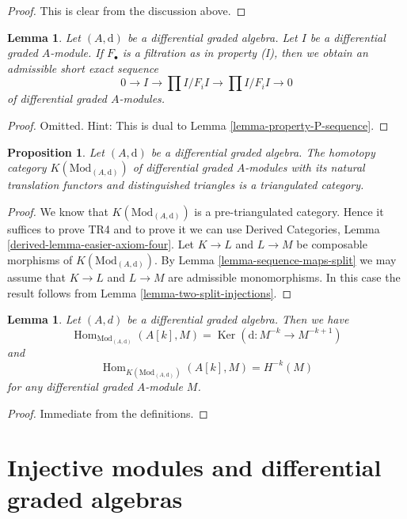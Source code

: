 \documentclass{stacks-project}
\theoremstyle{plain}
\newtheorem{proposition}[subsection]{Proposition}
\newtheorem{lemma}[subsection]{Lemma}
\theoremstyle{definition}
\theoremstyle{remark}
\numberwithin{equation}{subsection}
\def\Hom{\mathop{\mathrm{Hom}}\nolimits}
\def\Ker{\mathop{\mathrm{Ker}}}
\begin{document}
\begin{proof}
This is clear from the discussion above.
\end{proof}

\begin{lemma}
\label{lemma-property-I-sequence}
Let $(A, \text{d})$ be a differential graded algebra.
Let $I$ be a differential graded $A$-module. If $F_\bullet$
is a filtration as in property (I), then we obtain an
admissible short exact sequence
$$
0 \to I \to
\prod\nolimits I/F_iI \to
\prod\nolimits I/F_iI \to 0
$$
of differential graded $A$-modules.
\end{lemma}

\begin{proof}
Omitted. Hint: This is dual to Lemma \ref{lemma-property-P-sequence}.
\end{proof}

\begin{proposition}
\label{proposition-homotopy-category-triangulated}
Let $(A, \text{d})$ be a differential graded algebra. The homotopy category
$K(\text{Mod}_{(A, \text{d})})$ of differential graded $A$-modules with its
natural translation functors and distinguished triangles is a triangulated
category.
\end{proposition}

\begin{proof}
We know that $K(\text{Mod}_{(A, \text{d})})$ is a pre-triangulated category.
Hence it suffices to prove TR4 and to prove it we can use
Derived Categories, Lemma \ref{derived-lemma-easier-axiom-four}.
Let $K \to L$ and $L \to M$ be composable morphisms of
$K(\text{Mod}_{(A, \text{d})})$. By
Lemma \ref{lemma-sequence-maps-split} we may assume that
$K \to L$ and $L \to M$ are admissible monomorphisms.
In this case the result follows from
Lemma \ref{lemma-two-split-injections}.
\end{proof}

\begin{lemma}
\label{lemma-hom-from-shift-free}
Let $(A, d)$ be a differential graded algebra. Then we have
$$
\Hom_{\text{Mod}_{(A, \text{d})}}(A[k], M) =
\Ker(\text{d} : M^{-k} \to M^{-k + 1})
$$
and
$$
\Hom_{K(\text{Mod}_{(A, \text{d})})}(A[k], M) = H^{-k}(M)
$$
for any differential graded $A$-module $M$.
\end{lemma}

\begin{proof}
Immediate from the definitions.
\end{proof}

\section{Injective modules and differential graded algebras}
\label{section-modules-noncommutative-differential-graded}
\end{document}
